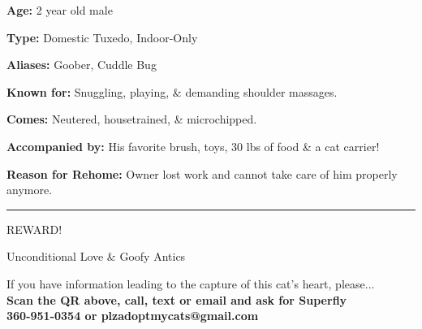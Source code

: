 \documentclass[12pt,a4paper]{article}
\begin{document}
\begin{tcolorbox}[
    colback=white!5!white,
    colframe=black!75!black,
    boxrule=3pt,
    arc=1mm,
    sharp corners=all,
    center title,
    bottomrule=2pt,
    toprule=2pt
]
\begin{center}
\begin{multicols}{2}
        \columnbreak
    \begin{flushleft}
    {\fontsize{18}{22}\selectfont
    \textbf{Age:} 2 year old male \par
    \vspace{0.4cm}
    \textbf{Type:} Domestic Tuxedo, Indoor-Only \par
    \vspace{0.4cm}
    \textbf{Aliases:} Goober, Cuddle Bug \par
    \vspace{0.4cm}
    \textbf{Known for:} Snuggling, playing, \& demanding shoulder massages. \par
    \vspace{0.4cm}
    \textbf{Comes:} Neutered, housetrained, \& microchipped. \par
    \vspace{0.4cm}
    \textbf{Accompanied by:} His favorite brush, toys, 30 lbs of food \& a cat carrier! \par
    \vspace{0.4cm}
    \textbf{Reason for Rehome:} Owner lost work and cannot take care of him properly anymore. \par
    \vspace{0.4cm}
    }
    \end{flushleft}
    \end{multicols}    
    
    \hrule
    \vspace{0.5cm}
    
    {\nashville\fontsize{110}{120}\selectfont REWARD!}\par
    \vspace{0.3cm}
    {\nashville\fontsize{50}{60}\selectfont Unconditional Love \& Goofy Antics}\par
    \vspace{0.5cm}
    
    {\fontsize{14}{16}\selectfont If you have information leading to the capture of this cat's heart, please...} \\
    \vspace{0.2cm}
    {\large\bfseries Scan the QR above, call, text or email and ask for Superfly} \\
    {\large\bfseries 360-951-0354 or plzadoptmycats@gmail.com}

\end{center}
\end{tcolorbox}
\end{document}
